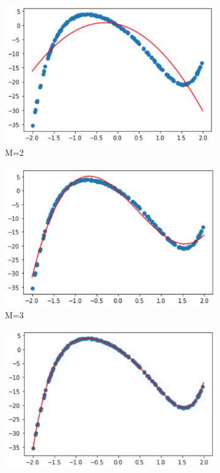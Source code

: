 \documentclass[11pt]{article}
\begin{document}
\begin{figure}[h]
\centering
	\begin{subfigure}[b]{0.45\textwidth}
	\centering
	\includegraphics[scale=0.7]{dataset1_200_lambda0_m2funcplot.jpg}
	\caption{    M=2}
	\label{fig:fig1.1.2.1}
	\end{subfigure}
	\hfill
	\begin{subfigure}[b]{0.45\textwidth}
	\centering
	\includegraphics[scale=0.7]{dataset1_200_lambda0_m3funcplot.jpg}
	\caption{    M=3}
	\label{fig:fig1.1.2.2}
	\end{subfigure}
	\hfill
	\begin{subfigure}[b]{0.45\textwidth}
	\centering
	\includegraphics[scale=0.7]{dataset1_200_lambda0_m6funcplot.jpg}

\end{subfigure}
\end{figure}
\end{document}

